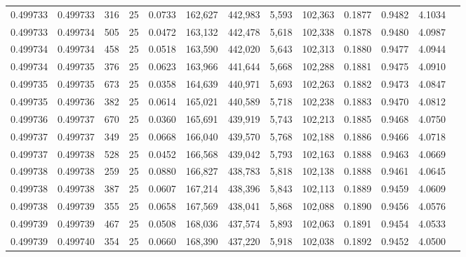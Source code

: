 \begin{tabular}{rrrrrrrrrrrrr}
0.499733 & 0.499733 &   316 &  25 &                                     0.0733 & 162,627 & 442,983 &   5,593 & 102,363 & 0.1877 & 0.9482 & 4.1034 \\
0.499733 & 0.499734 &   505 &  25 &                                     0.0472 & 163,132 & 442,478 &   5,618 & 102,338 & 0.1878 & 0.9480 & 4.0987 \\
0.499734 & 0.499734 &   458 &  25 &                                     0.0518 & 163,590 & 442,020 &   5,643 & 102,313 & 0.1880 & 0.9477 & 4.0944 \\
0.499734 & 0.499735 &   376 &  25 &                                     0.0623 & 163,966 & 441,644 &   5,668 & 102,288 & 0.1881 & 0.9475 & 4.0910 \\
0.499735 & 0.499735 &   673 &  25 &                                     0.0358 & 164,639 & 440,971 &   5,693 & 102,263 & 0.1882 & 0.9473 & 4.0847 \\
0.499735 & 0.499736 &   382 &  25 &                                     0.0614 & 165,021 & 440,589 &   5,718 & 102,238 & 0.1883 & 0.9470 & 4.0812 \\
0.499736 & 0.499737 &   670 &  25 &                                     0.0360 & 165,691 & 439,919 &   5,743 & 102,213 & 0.1885 & 0.9468 & 4.0750 \\
0.499737 & 0.499737 &   349 &  25 &                                     0.0668 & 166,040 & 439,570 &   5,768 & 102,188 & 0.1886 & 0.9466 & 4.0718 \\
0.499737 & 0.499738 &   528 &  25 &                                     0.0452 & 166,568 & 439,042 &   5,793 & 102,163 & 0.1888 & 0.9463 & 4.0669 \\
0.499738 & 0.499738 &   259 &  25 &                                     0.0880 & 166,827 & 438,783 &   5,818 & 102,138 & 0.1888 & 0.9461 & 4.0645 \\
0.499738 & 0.499738 &   387 &  25 &                                     0.0607 & 167,214 & 438,396 &   5,843 & 102,113 & 0.1889 & 0.9459 & 4.0609 \\
0.499738 & 0.499739 &   355 &  25 &                                     0.0658 & 167,569 & 438,041 &   5,868 & 102,088 & 0.1890 & 0.9456 & 4.0576 \\
0.499739 & 0.499739 &   467 &  25 &                                     0.0508 & 168,036 & 437,574 &   5,893 & 102,063 & 0.1891 & 0.9454 & 4.0533 \\
0.499739 & 0.499740 &   354 &  25 &                                     0.0660 & 168,390 & 437,220 &   5,918 & 102,038 & 0.1892 & 0.9452 & 4.0500 \\

\end{tabular}
